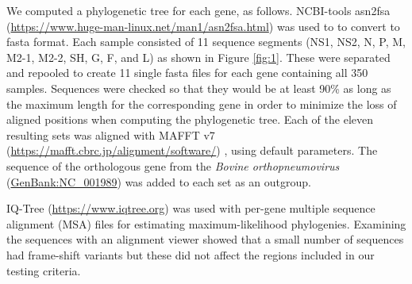 \documentclass{article} %
\begin{document}
We computed a phylogenetic tree for each gene, as follows.
NCBI-tools asn2fsa (\url{https://www.huge-man-linux.net/man1/asn2fsa.html}) was used to to convert to fasta format.
Each sample consisted of 11 sequence segments
(NS1, NS2, N, P, M, M2-1, M2-2, SH, G, F, and L) as shown in 
Figure \ref{fig:1}.
These were separated and repooled to create 11 single fasta files for each gene containing all 350 samples. 
Sequences were checked so that they would be at least 90\% as long as the maximum length 
for the corresponding gene in order to minimize the loss of aligned positions when computing the phylogenetic tree. 
Each of the eleven resulting sets was aligned with MAFFT v7 (\url{https://mafft.cbrc.jp/alignment/software/})
\citep{katoh2013mafft},
using default  parameters.
The sequence of the orthologous gene from the \textit{Bovine orthopneumovirus} 
(\href{https://www.ncbi.nlm.nih.gov/nuccore/NC_001989}{GenBank:NC\_001989}) 
was added to each set as an outgroup. 

IQ-Tree 
(\url{https://www.iqtree.org})
\citep{nguyen2015iq}
was used with per-gene multiple sequence alignment (MSA) files for estimating maximum-likelihood phylogenies.
Examining the sequences with an alignment viewer showed that a small number of sequences had frame-shift variants but these did not affect the regions included in our testing criteria.
\end{document}
